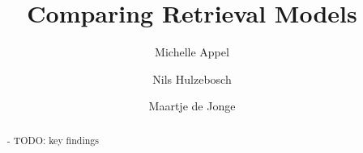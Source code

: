 \documentclass[sigconf]{acmart}
\begin{document}
\title{Comparing Retrieval Models}


\author{Michelle Appel}
\affiliation{%
}

\author{Nils Hulzebosch}

\author{Maartje de Jonge}




\begin{abstract}

- TODO: key findings

\end{abstract}

%
%




\maketitle








\end{document}
